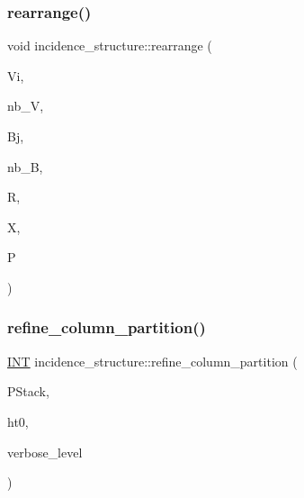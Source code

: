 \subsubsection{\texorpdfstring{rearrange()}{rearrange()}}
{\footnotesize\ttfamily void incidence\+\_\+structure\+::rearrange (\begin{DoxyParamCaption}\item[{\mbox{\hyperlink{galois_8h_a09fddde158a3a20bd2dcadb609de11dc}{I\+NT}} $\ast$\&}]{Vi,  }\item[{\mbox{\hyperlink{galois_8h_a09fddde158a3a20bd2dcadb609de11dc}{I\+NT}} \&}]{nb\+\_\+V,  }\item[{\mbox{\hyperlink{galois_8h_a09fddde158a3a20bd2dcadb609de11dc}{I\+NT}} $\ast$\&}]{Bj,  }\item[{\mbox{\hyperlink{galois_8h_a09fddde158a3a20bd2dcadb609de11dc}{I\+NT}} \&}]{nb\+\_\+B,  }\item[{\mbox{\hyperlink{galois_8h_a09fddde158a3a20bd2dcadb609de11dc}{I\+NT}} $\ast$\&}]{R,  }\item[{\mbox{\hyperlink{galois_8h_a09fddde158a3a20bd2dcadb609de11dc}{I\+NT}} $\ast$\&}]{X,  }\item[{\mbox{\hyperlink{classpartitionstack}{partitionstack}} \&}]{P }\end{DoxyParamCaption})}

\mbox{\label{classincidence__structure_ac262f307c1531d67496129dc7890cda4}} 
\subsubsection{\texorpdfstring{refine\+\_\+column\+\_\+partition()}{refine\_column\_partition()}}
{\footnotesize\ttfamily \mbox{\hyperlink{galois_8h_a09fddde158a3a20bd2dcadb609de11dc}{I\+NT}} incidence\+\_\+structure\+::refine\+\_\+column\+\_\+partition (\begin{DoxyParamCaption}\item[{\mbox{\hyperlink{classpartitionstack}{partitionstack}} \&}]{P\+Stack,  }\item[{\mbox{\hyperlink{galois_8h_a09fddde158a3a20bd2dcadb609de11dc}{I\+NT}}}]{ht0,  }\item[{\mbox{\hyperlink{galois_8h_a09fddde158a3a20bd2dcadb609de11dc}{I\+NT}}}]{verbose\+\_\+level }\end{DoxyParamCaption})}

